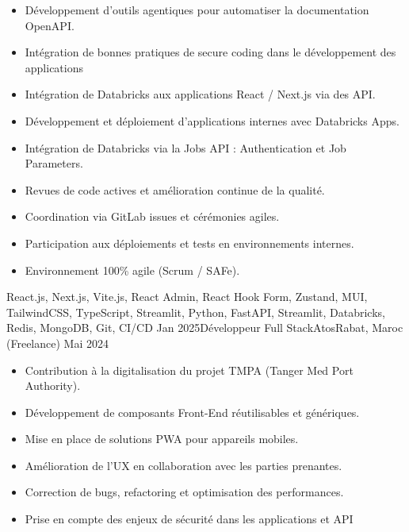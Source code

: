 \begin{experiences}
{\begin{itemize}
                \item Développement d'outils agentiques pour automatiser la documentation OpenAPI.
                \item Intégration de bonnes pratiques de secure coding dans le développement des applications
                \item Intégration de Databricks aux applications React / Next.js via des API.
                \item Développement et déploiement d'applications internes avec Databricks Apps.
                \item Intégration de Databricks via la Jobs API : Authentication et Job Parameters.
                \item Revues de code actives et amélioration continue de la qualité.
                \item Coordination via GitLab issues et cérémonies agiles.
                \item Participation aux déploiements et tests en environnements internes.
                \item Environnement 100\% agile (Scrum / SAFe).
            \end{itemize}}
            {React.js, Next.js, Vite.js, React Admin, React Hook Form, Zustand, MUI, TailwindCSS, TypeScript, Streamlit, Python, FastAPI, Streamlit, Databricks, Redis, MongoDB, Git, CI/CD}
    \emptySeparator
     \experience
        {Jan 2025}{Développeur Full Stack}{Atos}{Rabat, Maroc (Freelance)}
        {Mai 2024}
            {\begin{itemize}
                \item Contribution à la digitalisation du projet TMPA (Tanger Med Port Authority).
                \item Développement de composants Front-End réutilisables et génériques.
                \item Mise en place de solutions PWA pour appareils mobiles.
                \item Amélioration de l'UX en collaboration avec les parties prenantes.
                \item Correction de bugs, refactoring et optimisation des performances.
                \item Prise en compte des enjeux de sécurité dans les applications et API

\end{itemize}}
\end{experiences}
